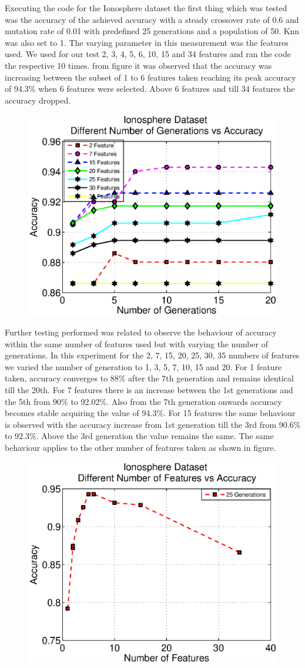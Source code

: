 \documentclass[11pt,onecolumn,a4paper]{report}
\begin{document}
Executing the code for the Ionosphere dataset the first thing which was tested was the accuracy of the achieved accuracy with a steady crossover rate of 0.6 and mutation rate of 0.01 with predefined 25 generations and a population of 50. Knn was also set to 1. The varying parameter in this measurement was the features used. We used for our test 2, 3, 4, 5, 6, 10, 15 and 34 features and ran the code the respective 10 times. from figure it was observed that the accuracy was increasing between the subset of 1 to 6 features taken reaching its peak accuracy of 94.3\% when 6 features were selected. Above 6 features and till 34 features the accuracy dropped.    
    \begin{figure}[h]
      \includegraphics[width=0.45\linewidth]{img/ionfeat.eps}
      \label{fig:digraph}
    \end{figure}
Further testing performed was related to observe the behaviour of accuracy within the same number of features used but with varying the number of generations. In this experiment for the 2, 7, 15, 20, 25, 30, 35 numbers of features we varied the number of generation to 1, 3, 5, 7, 10, 15 and 20. For 1 feature taken, accuracy converges to 88\% after the 7th generation and remains identical till the 20th. For 7 features there is an increase between the 1st generations and the 5th from 90\% to 92.02\%. Also from the 7th generation onwards accuracy becomes stable acquiring the value of 94.3\%. For 15 features the same behaviour is observed with the accuracy increase from 1st generation till the 3rd from 90.6\% to 92.3\%. Above the 3rd generation the value remains the same. The same behaviour applies to the other number of features taken as shown in figure.
    \begin{figure}[h]
      \includegraphics[width=0.45\linewidth]{img/ionfeat2.eps}
      \label{fig:digraph}
    \end{figure}
\end{document}
